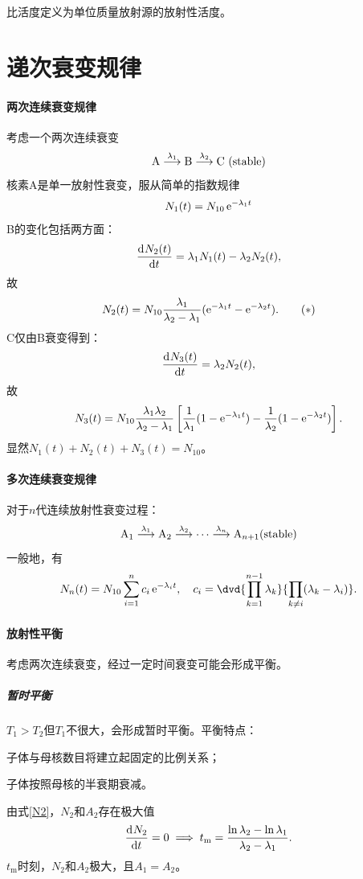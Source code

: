 
比活度定义为单位质量放射源的放射性活度。

\section{递次衰变规律}

\paragraph{两次连续衰变规律}
考虑一个两次连续衰变
\[
	\mathrm{A}\overset{\lambda_1}{\longrightarrow }\mathrm{B}\overset{\lambda_2}{\longrightarrow }\mathrm{C}~(\mathrm{stable})
\]
核素A是单一放射性衰变，服从简单的指数规律
\[
	N_1(t)=N_{10}\mathop{}\!\mathrm{e}^{-\lambda_1t}
\]
B的变化包括两方面：
\[
	\frac{\mathrm{d}^{{}}N_2(t)}{\mathrm{d}{t}^{{}}}=\lambda_1N_1(t)-\lambda_2N_2(t),
\]
故
\[\label{N2}
	N_2(t)=N_{10}\frac{\lambda_1}{\lambda_2-\lambda_1}(\mathop{}\!\mathrm{e}^{-\lambda_1t}-\mathop{}\!\mathrm{e}^{-\lambda_2t}).\tag{$\ast$}
\]
C仅由B衰变得到：
\[
	\frac{\mathrm{d}^{{}}N_3(t)}{\mathrm{d}{t}^{{}}}=\lambda_2N_2(t),
\]
故
\[
	N_3(t)=N_{10}\frac{\lambda_1\lambda_2}{\lambda_2-\lambda_1}\left[\frac1{\lambda_1}(1-\mathop{}\!\mathrm{e}^{-\lambda_1t})-\frac1{\lambda_2}(1-\mathop{}\!\mathrm{e}^{-\lambda_2t})\right].
\]
显然$N_1(t)+N_2(t)+N_3(t)=N_{10}$。
\paragraph{多次连续衰变规律}
对于$n$代连续放射性衰变过程：
\[
	\mathrm{A}_1\overset{\lambda_1}{\longrightarrow }\mathrm{A}_2\overset{\lambda_2}{\longrightarrow }\cdots\overset{\lambda_n}{\longrightarrow }\mathrm{A}_{n+1}(\mathrm{stable})
\]
一般地，有
\[
	N_n(t)=N_{10}\sum_{i=1}^nc_i\e{-\lambda_it},\quad c_i=\dvd{\prod_{k=1}^{n-1}\lambda_k}{\prod_{k\neq i}(\lambda_k-\lambda_i)}.
\]
\paragraph{放射性平衡}考虑两次连续衰变，经过一定时间衰变可能会形成平衡。
\subparagraph{暂时平衡}$T_1>T_2$但$T_1$不很大，会形成暂时平衡。平衡特点：
\begin{compactenum}
	\item 子体与母核数目将建立起固定的比例关系；
	\item 子体按照母核的半衰期衰减。
\end{compactenum}
由式\eqref{N2}，$N_2$和$A_2$存在极大值
\begin{align}
	\frac{\mathrm{d}^{{}}N_2}{\mathrm{d}{t}^{{}}}=0\implies t_\mathrm m=\frac{\ln\lambda_2-\ln\lambda_1}{\lambda_2-\lambda_1}.
\end{align}
$t_\mathrm m$时刻，$N_2$和$A_2$极大，且$A_1=A_2$。

